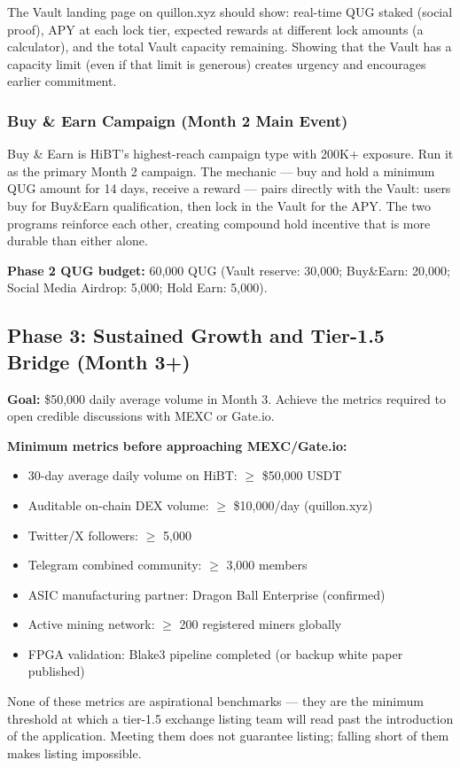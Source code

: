 \documentclass[11pt,a4paper]{article}
\begin{document}
The Vault landing page on quillon.xyz should show: real-time QUG staked (social proof), APY at each lock tier, expected rewards at different lock amounts (a calculator), and the total Vault capacity remaining. Showing that the Vault has a capacity limit (even if that limit is generous) creates urgency and encourages earlier commitment.

\subsubsection{Buy \& Earn Campaign (Month 2 Main Event)}

Buy \& Earn is HiBT's highest-reach campaign type with 200K+ exposure. Run it as the primary Month 2 campaign. The mechanic — buy and hold a minimum QUG amount for 14 days, receive a reward — pairs directly with the Vault: users buy for Buy\&Earn qualification, then lock in the Vault for the APY. The two programs reinforce each other, creating compound hold incentive that is more durable than either alone.

\textbf{Phase 2 QUG budget:} 60,000 QUG (Vault reserve: 30,000; Buy\&Earn: 20,000; Social Media Airdrop: 5,000; Hold Earn: 5,000).

\subsection{Phase 3: Sustained Growth and Tier-1.5 Bridge (Month 3+)}

\textbf{Goal:} \$50,000 daily average volume in Month 3. Achieve the metrics required to open credible discussions with MEXC or Gate.io.

\begin{tcolorbox}[goldbox]
\textbf{Minimum metrics before approaching MEXC/Gate.io:}
\begin{itemize}[leftmargin=1em, itemsep=2pt]
  \item 30-day average daily volume on HiBT: $\geq$ \$50,000 USDT
  \item Auditable on-chain DEX volume: $\geq$ \$10,000/day (quillon.xyz)
  \item Twitter/X followers: $\geq$ 5,000
  \item Telegram combined community: $\geq$ 3,000 members
  \item ASIC manufacturing partner: Dragon Ball Enterprise (confirmed)
  \item Active mining network: $\geq$ 200 registered miners globally
  \item FPGA validation: Blake3 pipeline completed (or backup white paper published)
\end{itemize}

None of these metrics are aspirational benchmarks — they are the minimum threshold at which a tier-1.5 exchange listing team will read past the introduction of the application. Meeting them does not guarantee listing; falling short of them makes listing impossible.
\end{tcolorbox}
\end{document}
